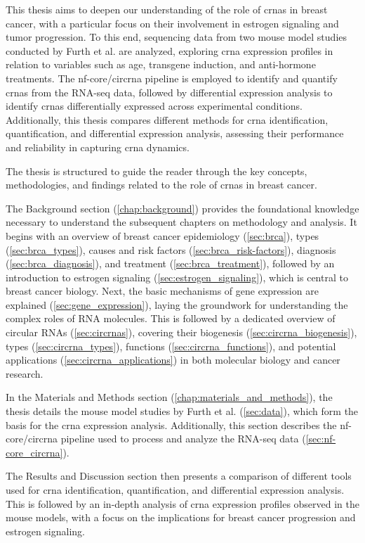 This thesis aims to deepen our understanding of the role of \glspl{crna} in
breast cancer, with a particular focus on their involvement in estrogen
signaling and tumor progression.
To this end, sequencing data from two mouse model studies conducted by Furth et
al.
\supercite{furth_esr1_2023,furth_overexpression_2023}
are analyzed, exploring \gls{crna} expression profiles in relation to variables
such as age, transgene induction, and anti-hormone treatments.
The nf-core/circrna pipeline\supercite{digby_nf-corecircrna_2023} is employed
to identify and quantify \glspl{crna} from the RNA-seq data, followed by
differential expression analysis to identify \glspl{crna} differentially
expressed across experimental conditions.
Additionally, this thesis compares different methods for \gls{crna}
identification, quantification, and differential expression analysis, assessing
their performance and reliability in capturing \gls{crna} dynamics.

\medskip
\noindent The thesis is structured to guide the reader through the key
concepts,
methodologies, and findings related to the role of \glspl{crna} in breast
cancer.

The Background section (\cref{chap:background}) provides the foundational
knowledge necessary to understand the subsequent chapters on methodology and
analysis.
It begins with an overview of breast cancer epidemiology (\cref{sec:brca}),
types (\cref{sec:brca_types}), causes and risk factors
(\cref{sec:brca_risk-factors}), diagnosis (\cref{sec:brca_diagnosis}), and
treatment (\cref{sec:brca_treatment}), followed by an introduction to estrogen
signaling (\cref{sec:estrogen_signaling}), which is central to breast cancer
biology.
Next, the basic mechanisms of gene expression are explained
(\cref{sec:gene_expression}), laying the groundwork for understanding the
complex roles of RNA molecules.
This is followed by a dedicated overview of circular RNAs
(\cref{sec:circrnas}), covering their biogenesis
(\cref{sec:circrna_biogenesis}), types (\cref{sec:circrna_types}), functions
(\cref{sec:circrna_functions}), and potential applications
(\cref{sec:circrna_applications}) in both molecular biology and cancer
research.

In the Materials and Methods section (\cref{chap:materials_and_methods}), the
thesis details the mouse model studies by Furth et al.
\supercite{furth_esr1_2023,furth_overexpression_2023} (\cref{sec:data}),
which form the basis for the \gls{crna} expression
analysis.
Additionally, this section describes the nf-core/circrna
pipeline\supercite{digby_nf-corecircrna_2023} used to process and analyze the
RNA-seq data (\cref{sec:nf-core_circrna}).

The Results and Discussion section then presents a comparison of different
tools used for \gls{crna} identification, quantification, and differential
expression analysis.
This is followed by an in-depth analysis of \gls{crna} expression profiles
observed in the mouse models, with a focus on the implications for breast
cancer progression and estrogen signaling.
